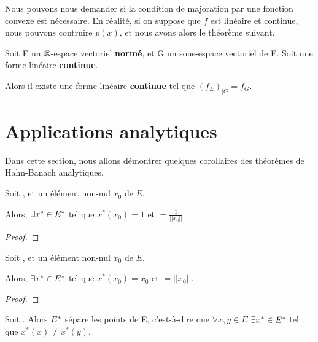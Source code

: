 Nous pouvons nous demander si la condition de majoration par une fonction
convexe est nécessaire. En réalité, si on suppose que $f$ est linéaire et
continue, nous pouvons contruire $p(x)$, et nous avons alors le théorème
suivant.

\begin{theorem} 
	Soit E un $\mathbb{R}$-espace vectoriel \textbf{normé}, et G un sous-espace
	vectoriel de E.
	Soit  une forme linéaire
	\textbf{continue}.

	Alors il existe une forme linéaire \textbf{continue}
	 tel que $(f_{E})_{|G} = f_{G}$.
	\label{hahn-banach-analytic-2}
\end{theorem}

\section{Applications analytiques}

Dans cette section, nous allons démontrer quelques corollaires des théorèmes de
Hahn-Banach analytiques.

\begin{corollary}
	Soit , et un élément non-nul $x_{0}$ de $E$.

	Alors, $\exists x^{*} \in E^{*}$ tel que $x^{*}(x_{0}) = 1$ et
	 $= \frac{1}{||x_{0}||}$
\end{corollary}

\begin{proof}
	
\end{proof}

\begin{corollary}
	Soit , et un élément non-nul $x_{0}$ de $E$.

	Alors, $\exists x^{*} \in E^{*}$ tel que $x^{*}(x_{0}) = x_{0}$ et
	 $= ||x_{0}||$.
\end{corollary}

\begin{proof}
	
\end{proof}

\begin{corollary}
	Soit . Alors $E^{*}$ sépare les points de
	E, c'est-à-dire que $\forall x, y \in E$ $\exists x^{*} \in E^{*}$ tel
	que $x^{*}(x) \neq x^{*}(y)$.
\end{corollary}

